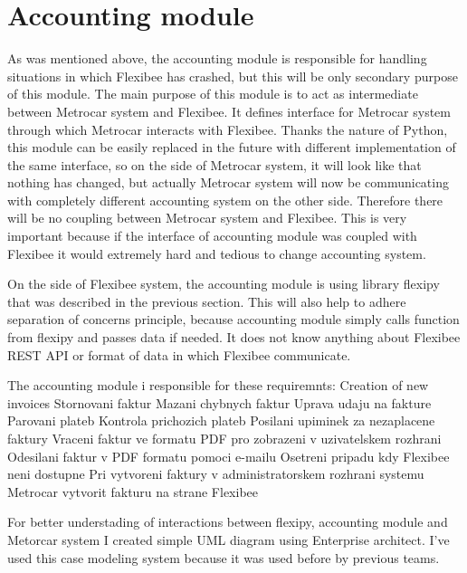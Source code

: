 \documentclass[11pt,twoside,a4paper]{book}
\begin{document}
\section{Accounting module}
As was mentioned above, the accounting module is responsible for handling situations in which Flexibee has crashed, but this will be only secondary purpose of this module. The main purpose of this module is to act as intermediate between Metrocar system and Flexibee. It defines interface for Metrocar system through which Metrocar interacts with Flexibee. Thanks the nature of Python, this module can be easily replaced in the future with different implementation of the same interface, so on the side of Metrocar system, it will look like that nothing has changed, but actually Metrocar system will now be communicating with completely different accounting system on the other side. Therefore there will be no coupling between Metrocar system and Flexibee. This is very important because if the interface of accounting module was coupled with Flexibee it would extremely hard and tedious to change accounting system. 

On the side of Flexibee system, the accounting module is using library flexipy that was described in the previous section. This will also help to adhere separation of concerns principle\cite{wiki:soc}, because accounting module simply calls function from flexipy and passes data if needed. It does not know anything about Flexibee REST API or format of data in which Flexibee communicate. 

The accounting module i responsible for these requiremnts:
Creation of new invoices
Stornovani faktur
Mazani chybnych faktur
Uprava udaju na fakture
Parovani plateb
Kontrola prichozich plateb
Posilani upiminek za nezaplacene faktury
Vraceni faktur ve formatu PDF pro zobrazeni v uzivatelskem rozhrani
Odesilani faktur v PDF formatu pomoci e-mailu
Osetreni pripadu kdy Flexibee neni dostupne
Pri vytvoreni faktury v administratorskem rozhrani systemu Metrocar vytvorit fakturu na strane Flexibee

For better understading of interactions between flexipy, accounting module and Metorcar system I created simple UML diagram using Enterprise architect. I've used this case modeling system because it was used before by previous teams.

\end{document}

